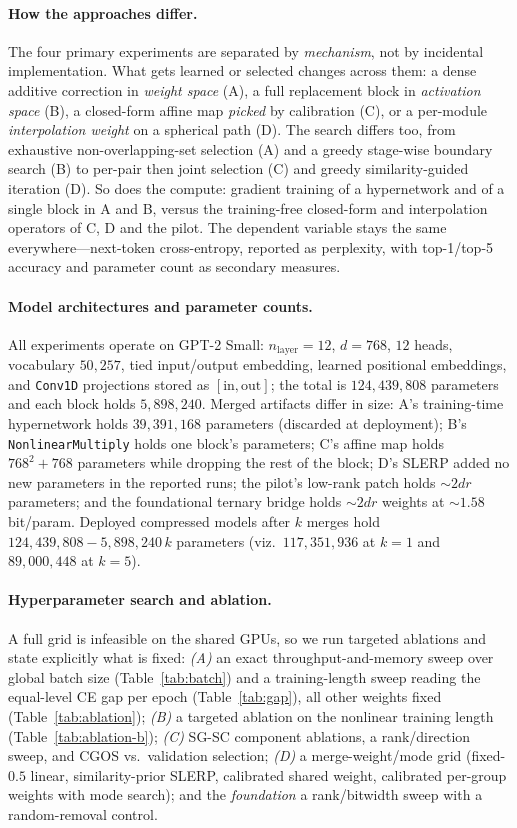\documentclass[10pt,a4paper]{article}
\newcommand{\nlop}{\texttt{NonlinearMultiply}}
\begin{document}
\paragraph{How the approaches differ.} The four primary experiments are
separated by \emph{mechanism}, not by incidental implementation. What gets
learned or selected changes across them: a dense additive correction in
\emph{weight space} (A), a full replacement block in \emph{activation space}
(B), a closed-form affine map \emph{picked} by calibration (C), or a per-module
\emph{interpolation weight} on a spherical path (D). The search differs too,
from exhaustive non-overlapping-set selection (A) and a greedy stage-wise
boundary search (B) to per-pair then joint selection (C) and greedy
similarity-guided iteration (D). So does the compute: gradient training of a
hypernetwork and of a single block in A and B, versus the training-free
closed-form and interpolation operators of C, D and the pilot. The dependent
variable stays the same everywhere---next-token cross-entropy, reported as
perplexity, with top-1/top-5 accuracy and parameter count as secondary
measures.

\paragraph{Model architectures and parameter counts.} All experiments operate on
GPT-2 Small: $n_\text{layer}=12$, $d=768$, $12$ heads, vocabulary $50{,}257$,
tied input/output embedding, learned positional embeddings, and \texttt{Conv1D}
projections stored as $[\text{in},\text{out}]$; the total is $124{,}439{,}808$
parameters and each block holds $5{,}898{,}240$. Merged artifacts differ in
size: A's training-time hypernetwork holds $39{,}391{,}168$ parameters (discarded
at deployment); B's \nlop{} holds one block's parameters; C's affine map holds
$768^2+768$ parameters while dropping the rest of the block; D's SLERP added no
new parameters in the reported runs; the pilot's low-rank patch holds
${\sim}2dr$ parameters; and the foundational ternary bridge holds ${\sim}2dr$
weights at ${\sim}1.58$ bit/param. Deployed compressed models after $k$ merges
hold $124{,}439{,}808-5{,}898{,}240\,k$ parameters (viz.\ $117{,}351{,}936$ at
$k=1$ and $89{,}000{,}448$ at $k=5$).

\paragraph{Hyperparameter search and ablation.} A full grid is infeasible on the
shared GPUs, so we run targeted ablations and state explicitly what is fixed:
\emph{(A)} an exact throughput-and-memory sweep over global batch size
(Table~\ref{tab:batch}) and a training-length sweep reading the equal-level CE
gap per epoch (Table~\ref{tab:gap}), all other weights fixed
(Table~\ref{tab:ablation}); \emph{(B)} a targeted ablation on the nonlinear
training length (Table~\ref{tab:ablation-b}); \emph{(C)} SG-SC component
ablations, a rank/direction sweep, and CGOS vs.\ validation selection;
\emph{(D)} a merge-weight/mode grid (fixed-$0.5$ linear, similarity-prior SLERP,
calibrated shared weight, calibrated per-group weights with mode search); and
the \emph{foundation} a rank/bitwidth sweep with a random-removal control.
\end{document}
